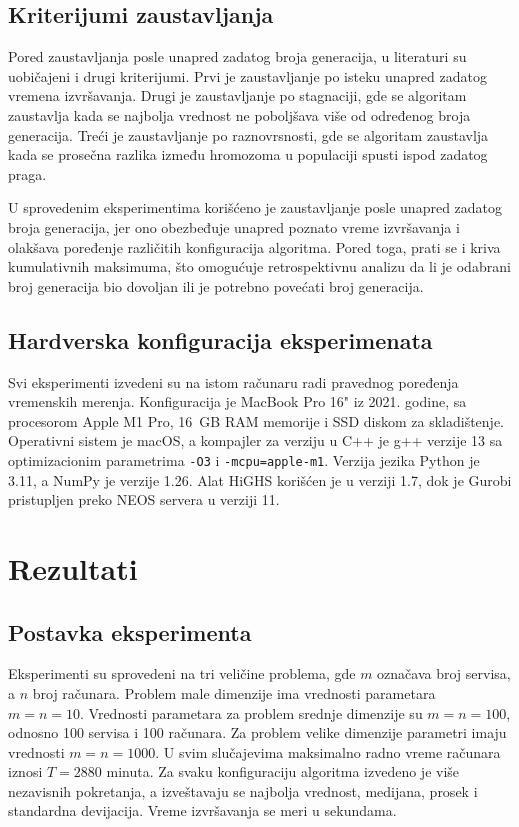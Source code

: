 \documentclass[12pt]{article}
\begin{document}
\subsection{Kriterijumi zaustavljanja}

Pored zaustavljanja posle unapred zadatog broja generacija, u literaturi su uobičajeni i drugi kriterijumi. Prvi je zaustavljanje po isteku unapred zadatog vremena izvršavanja. Drugi je zaustavljanje po stagnaciji, gde se algoritam zaustavlja kada se najbolja vrednost ne poboljšava više od određenog broja generacija. Treći je zaustavljanje po raznovrsnosti, gde se algoritam zaustavlja kada se prosečna razlika između hromozoma u populaciji spusti ispod zadatog praga.

U sprovedenim eksperimentima korišćeno je zaustavljanje posle unapred zadatog broja generacija, jer ono obezbeđuje unapred poznato vreme izvršavanja i olakšava poređenje različitih konfiguracija algoritma. Pored toga, prati se i kriva kumulativnih maksimuma, što omogućuje retrospektivnu analizu da li je odabrani broj generacija bio dovoljan ili je potrebno povećati broj generacija.

\subsection{Hardverska konfiguracija eksperimenata}

Svi eksperimenti izvedeni su na istom računaru radi pravednog poređenja vremenskih merenja. Konfiguracija je MacBook Pro 16" iz 2021. godine, sa procesorom Apple M1 Pro, 16~GB RAM memorije i SSD diskom za skladištenje. Operativni sistem je macOS, a kompajler za verziju u C++ je g++ verzije 13 sa optimizacionim parametrima \texttt{-O3} i \texttt{-mcpu=apple-m1}. Verzija jezika Python je 3.11, a NumPy je verzije 1.26. Alat HiGHS korišćen je u verziji 1.7, dok je Gurobi pristupljen preko NEOS servera u verziji 11.

\pagebreak

\section{Rezultati}\label{sec:rezultati}

\subsection{Postavka eksperimenta}

Eksperimenti su sprovedeni na tri veličine problema, gde $m$ označava broj servisa, a $n$ broj računara. Problem male dimenzije ima vrednosti parametara $m = n = 10$. Vrednosti parametara za problem srednje dimenzije su $m = n = 100$, odnosno 100 servisa i 100 računara. Za problem velike dimenzije parametri imaju vrednosti $m = n = 1000$. U svim slučajevima maksimalno radno vreme računara iznosi $T = 2880$ minuta. Za svaku konfiguraciju algoritma izvedeno je više nezavisnih pokretanja, a izveštavaju se najbolja vrednost, medijana, prosek i standardna devijacija. Vreme izvršavanja se meri u sekundama.
\end{document}
